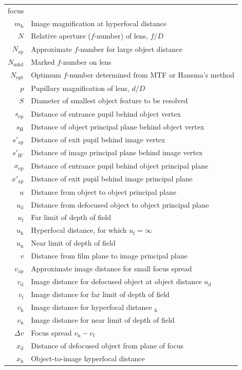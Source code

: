 \documentclass[11pt, oneside]{scrartcl}   	%
\newcommand{\Dv}{\ensuremath{\Delta v}}
\begin{document}
\begin{center}
{\begin{tabular}{r@{~=~}l}
     focus      \\
$m_\mathrm{h}$ & Image magnification at hyperfocal distance     \\
$N$ & Relative aperture ($f$-number) of lens, $f/D$     \\
$N_\mathrm{ap}$ & Approximate $f$-number for large object distance     \\
$N_\mathrm{mkd}$ & Marked $f$-number on lens     \\
$N_\mathrm{opt}$ & Optimum $f$-number determined from MTF or Hansma’s method     \\
$p$ & Pupillary magnification of lens, $d/D$     \\
$S$ & Diameter of smallest object feature to be resolved      \\
$s_\mathrm{ep}$ & Distance of entrance pupil behind object vertex     \\
$s_\mathrm{H}$ & Distance of object principal plane behind object vertex      \\
$s'_\mathrm{ap}$ & Distance of exit pupil behind image vertex     \\
$s'_\mathrm{H'}$ & Distance of image principal plane behind image vertex     \\
$x_\mathrm{ep}$& Distance of entrance pupil behind object principal plane      \\
$x'_\mathrm{ap}$ & Distance of exit pupil behind image principal plane     \\
$u$ & Distance from object to object principal plane     \\
$u_\mathrm{d}$ & Distance from defocused object to object principal plane     \\
$u_\mathrm{f}$ & Far limit of depth of field     \\
$u_\mathrm{h}$ & Hyperfocal distance, for which $u_\mathrm{f} = \infty$      \\
$u_\mathrm{n}$ & Near limit of depth of field     \\
$v$ & Distance from film plane to image principal plane      \\
$v_\mathrm{ap}$ & Approximate image distance for small focus spread     \\
$v_\mathrm{d}$ & Image distance for defocused object at object distance $u_\mathrm{d}$      \\
$v_\mathrm{f}$ & Image distance for far limit of depth of field     \\
$v_\mathrm{h}$ & Image distance for hyperfocal distance $_\mathrm{h}$     \\
$v_\mathrm{n}$ & Image distance for near limit of depth of field      \\
$\Dv$ & Focus spread $v_\mathrm{n} - v_\mathrm{f}$     \\
$x_\mathrm{d}$ & Distance of defocused object from plane of focus      \\
$x_\mathrm{h}$ & Object-to-image hyperfocal distance     \\
\end{tabular}
}
\end{center}
\end{document}
